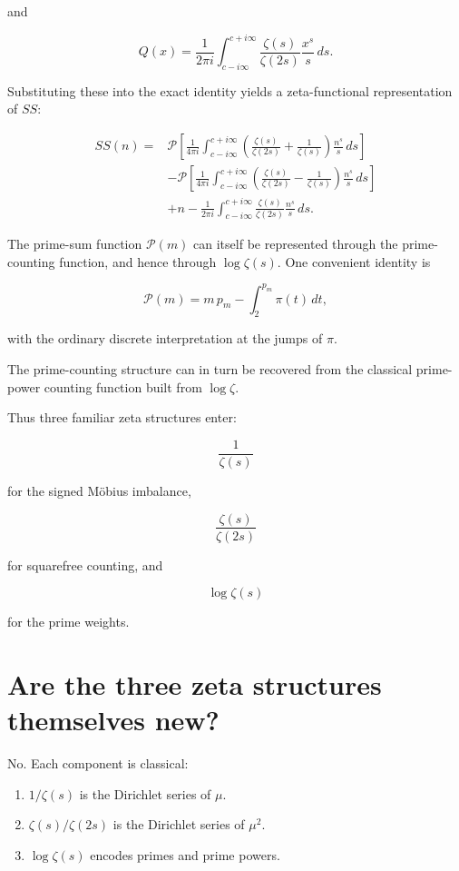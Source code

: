 \documentclass[11pt]{amsart}
\newcommand{\mob}{\mu}
\newcommand{\Sq}{Q}
\newcommand{\PS}{\mathcal P}
\begin{document}
and

\[
\Sq(x)
=
\frac{1}{2\pi i}
\int_{c-i\infty}^{c+i\infty}
\frac{\zeta(s)}{\zeta(2s)}
\frac{x^s}{s}\,ds.
\]

Substituting these into the exact identity yields a zeta-functional representation of $SS$:

\[
\begin{aligned}
SS(n)
={}&
\PS\!\left[
\frac{1}{4\pi i}
\int_{c-i\infty}^{c+i\infty}
\left(
\frac{\zeta(s)}{\zeta(2s)}
+
\frac1{\zeta(s)}
\right)
\frac{n^s}{s}\,ds
\right]
\\
&-
\PS\!\left[
\frac{1}{4\pi i}
\int_{c-i\infty}^{c+i\infty}
\left(
\frac{\zeta(s)}{\zeta(2s)}
-
\frac1{\zeta(s)}
\right)
\frac{n^s}{s}\,ds
\right]
\\
&+
n
-
\frac{1}{2\pi i}
\int_{c-i\infty}^{c+i\infty}
\frac{\zeta(s)}{\zeta(2s)}
\frac{n^s}{s}\,ds.
\end{aligned}
\]

The prime-sum function $\PS(m)$ can itself be represented through the prime-counting function, and hence through $\log\zeta(s)$. One convenient identity is

\[
\PS(m)
=
m\,p_m
-
\int_2^{p_m}\pi(t)\,dt,
\]

with the ordinary discrete interpretation at the jumps of $\pi$.

The prime-counting structure can in turn be recovered from the classical prime-power counting function built from $\log\zeta$.

Thus three familiar zeta structures enter:

\[
\boxed{\frac1{\zeta(s)}}
\]

for the signed M\"obius imbalance,

\[
\boxed{\frac{\zeta(s)}{\zeta(2s)}}
\]

for squarefree counting, and

\[
\boxed{\log\zeta(s)}
\]

for the prime weights.

\section{Are the three zeta structures themselves new?}

No. Each component is classical:

\begin{enumerate}[label=(\alph*)]
\item $1/\zeta(s)$ is the Dirichlet series of $\mob$.
\item $\zeta(s)/\zeta(2s)$ is the Dirichlet series of $\mob^2$.
\item $\log\zeta(s)$ encodes primes and prime powers.
\end{enumerate}
\end{document}
